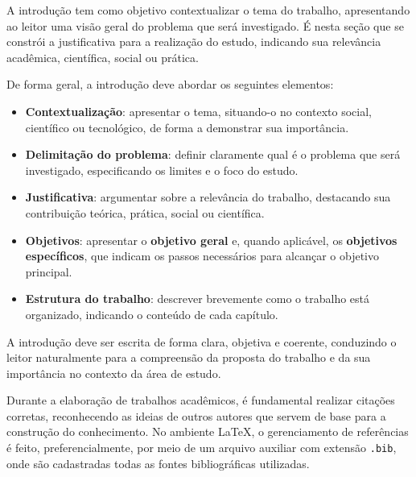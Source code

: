 \label{sec:introducao}

A introdução tem como objetivo contextualizar o tema do trabalho, apresentando ao leitor uma visão geral do problema que será investigado. É nesta seção que se constrói a justificativa para a realização do estudo, indicando sua relevância acadêmica, científica, social ou prática.

De forma geral, a introdução deve abordar os seguintes elementos:

\begin{itemize}
    \item \textbf{Contextualização}: apresentar o tema, situando-o no contexto social, científico ou tecnológico, de forma a demonstrar sua importância.
    
    \item \textbf{Delimitação do problema}: definir claramente qual é o problema que será investigado, especificando os limites e o foco do estudo.
    
    \item \textbf{Justificativa}: argumentar sobre a relevância do trabalho, destacando sua contribuição teórica, prática, social ou científica.
    
    \item \textbf{Objetivos}: apresentar o \textbf{objetivo geral} e, quando aplicável, os \textbf{objetivos específicos}, que indicam os passos necessários para alcançar o objetivo principal.
    
    \item \textbf{Estrutura do trabalho}: descrever brevemente como o trabalho está organizado, indicando o conteúdo de cada capítulo.
\end{itemize}

A introdução deve ser escrita de forma clara, objetiva e coerente, conduzindo o leitor naturalmente para a compreensão da proposta do trabalho e da sua importância no contexto da área de estudo.

\label{subsec:citref}

Durante a elaboração de trabalhos acadêmicos, é fundamental realizar citações corretas, reconhecendo as ideias de outros autores que servem de base para a construção do conhecimento. No ambiente \LaTeX, o gerenciamento de referências é feito, preferencialmente, por meio de um arquivo auxiliar com extensão \texttt{.bib}, onde são cadastradas todas as fontes bibliográficas utilizadas.


